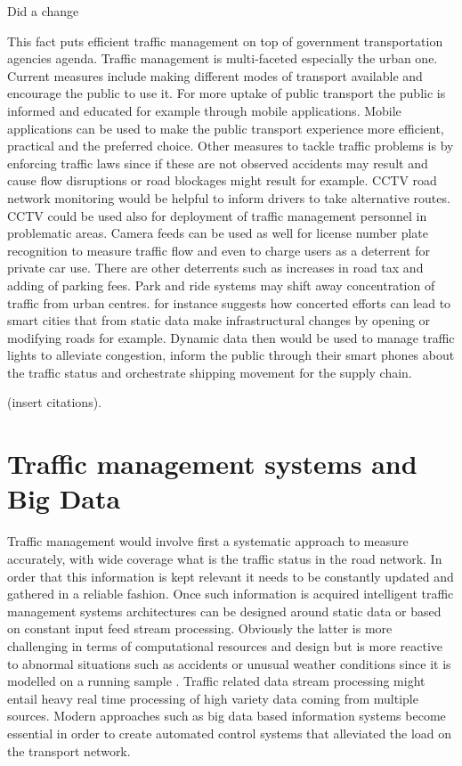 \documentclass[12pt, a4paper]{report}
\theoremstyle{definition}
\theoremstyle{definition}%
\theoremstyle{definition}%
\theoremstyle{definition}%
\theoremstyle{definition}%
\theoremstyle{definition}%
\begin{document}
Did a change

This fact puts efficient traffic management on top of government transportation agencies agenda.
Traffic management is multi-faceted especially the urban one. Current measures include making different modes of transport available and encourage the public to use it. For more uptake of public transport the public is informed and educated for example through mobile applications.  Mobile applications can be used to make the public transport experience more efficient, practical and the preferred choice. Other measures to tackle traffic problems is by enforcing traffic laws since if these are not observed accidents may result and cause flow disruptions or road blockages might result for example. CCTV road network monitoring would be helpful to inform drivers to take alternative routes. CCTV could be used also for deployment of traffic management personnel in problematic areas. Camera feeds can be used as well for license number plate recognition to measure traffic flow and even to charge users as a deterrent for private car use. There are other deterrents such as increases in road tax and adding of parking fees. Park and ride systems may shift away concentration of traffic from urban centres.  \cite{AlNuaimi2015} for instance suggests how concerted efforts can lead to smart cities that from static data make infrastructural changes by opening or modifying roads for example. Dynamic data  then would be used to manage traffic lights to alleviate congestion, inform the public through their smart phones about the traffic status and orchestrate shipping movement for the supply chain.

(insert citations). 


\section{Traffic management systems and Big Data}

Traffic management would involve first a systematic approach to measure accurately, with wide coverage what is the traffic status in the road network. In order that this information is kept relevant it needs to be constantly updated and gathered in a reliable fashion. Once such information is acquired intelligent traffic management systems architectures can be designed around static data or based  on constant input feed stream processing. Obviously the latter is more challenging in terms of computational resources and design but is more reactive to abnormal situations such as accidents or unusual weather conditions since it is modelled on a running sample \cite{Toole2015}. Traffic related data stream processing might entail heavy real time processing of high variety data coming from multiple sources. Modern approaches such as big data based information systems become essential in order to create automated control systems that alleviated the load on the transport network.
\end{document}
